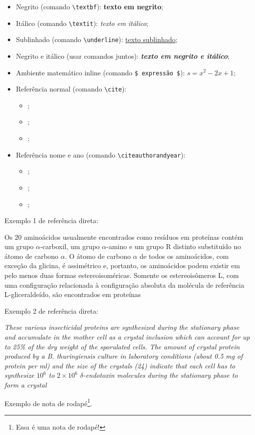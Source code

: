 \begin{itemize}
	\item Negrito (comando \verb|\textbf|): \textbf{texto em negrito};
	\item Itálico (comando \verb|\textit|): \textit{texto em itálico};
	\item Sublinhado (comando \verb|\underline|): \underline{texto sublinhado};
	\item Negrito e itálico (usar comandos juntos): \textbf{\textit{texto em negrito e itálico}};
	\item Ambiente matemático inline (comando \verb|$ expressão $|): $s = x^2-2x +1$;
	\item Referência normal (comando \verb|\cite|):
	\begin{itemize}
		\item \cite{Agaisse1995};
		\item \cite{Abedi2014};
		\item \cite{AgapitoTenfen2014};
	\end{itemize}
	\item Referência nome e ano (comando \verb|\citeauthorandyear|):
	\begin{itemize}
		\item {};
		\item {};
		\item {};
	\end{itemize}
\end{itemize}


Exemplo 1 de referência direta:

\begin{citacao}
	Os 20 aminoácidos usualmente encontrados como resíduos em proteínas contém um grupo $\alpha$-carboxil, um grupo $\alpha$-amino e um grupo R distinto substituído no átomo de carbono $\alpha$. O átomo de carbono $\alpha$ de todos os aminoácidos, com exceção da glicina, é assimétrico e, portanto, os aminoácidos podem existir em pelo menos duas formas estereoisoméricas. Somente os estereoisômeros L, com uma configuração relacionada à configuração absoluta da molécula de referência L-gliceraldeído, são encontrados em proteínas \cite[p. 81]{Nelson2014}
\end{citacao}

Exemplo 2 de referência direta:

\begin{citacao}
	\textit{These various insecticidal proteins are synthesized during the stationary phase and accumulate in the mother cell as a crystal inclusion which can account for up to 25\% of the dry weight of the sporulated cells. The amount of crystal protein produced by a B. thuringiensis culture in laboratory conditions (about 0.5 mg of protein per ml) and the size of the crystals (24) indicate that each cell has to synthesize $10^6$ to $2 \times 10^6$ $\delta$-endotoxin molecules during the stationary phase to form a crystal} \cite[p. 1]{Agaisse1995}
\end{citacao}

Exemplo de nota de rodapé\footnote{Essa é uma nota de rodapé!}.
